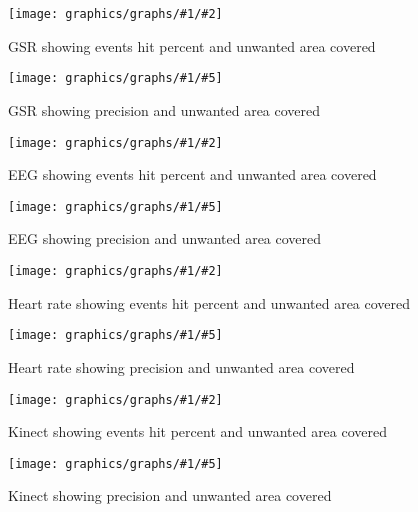 \newcommand{\fuckinggraph}[7]{
    \begin{figure}[h!]
    \begin{minipage}[t]{0.5\textwidth}
        \texttt{[image: graphics/graphs/\#1/\#2]}
        \caption{#3}
        \label{#4}
    \end{minipage}
    \hspace*{\fill} %
    \begin{minipage}[t]{0.5\textwidth}
        \texttt{[image: graphics/graphs/\#1/\#5]}
        \caption{#6}
        \label{#7}
    \end{minipage}
    \end{figure}
}

\newcommand{\fuckinggraphevenidontwanttorepeatmyself}[6]{ %
  \fuckinggraph{#1}
  {False_cover_rate_(FCR)-Events_hit_rate_(EHR)-CovNu-#2.pdf}{#3}{#4}
  {False_cover_rate_(FCR)-Precision-CovNu-#2.pdf}{#5}{#6}
}
\fuckinggraphevenidontwanttorepeatmyself{short}{GSR}
{GSR showing events hit percent and unwanted area covered}{fig:gsr_event_ehr}
{GSR showing precision and unwanted area covered}         {lab:gsr_pres_ehr}

\fuckinggraphevenidontwanttorepeatmyself{short}{EEG}
{EEG showing events hit percent and unwanted area covered}{fig:eeg_event_ehr}
{EEG showing precision and unwanted area covered}         {lab:eeg_pres_ehr}

\fuckinggraphevenidontwanttorepeatmyself{short}{HR}
{Heart rate showing events hit percent and unwanted area covered}{fig:hr_event_ehr}
{Heart rate showing precision and unwanted area covered}         {fig:hr_pres_ehr}

\fuckinggraphevenidontwanttorepeatmyself{short}{FACE}
{Kinect showing events hit percent and unwanted area covered}{fig:face_event_ehr}
{Kinect showing precision and unwanted area covered}         {lab:face_pres_ehr}